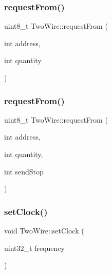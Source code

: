 \mbox{\label{class_two_wire_ad40a27213d0bb32f7b819aa8962fccd3}} 
\subsubsection{\texorpdfstring{request\+From()}{requestFrom()}\hspace{0.1cm}{\footnotesize\ttfamily [4/5]}}
{\footnotesize\ttfamily uint8\+\_\+t Two\+Wire\+::request\+From (\begin{DoxyParamCaption}\item[{int}]{address,  }\item[{int}]{quantity }\end{DoxyParamCaption})}

\mbox{\label{class_two_wire_a3d76da36fb8571e0b5e8310e9f86f6fe}} 
\subsubsection{\texorpdfstring{request\+From()}{requestFrom()}\hspace{0.1cm}{\footnotesize\ttfamily [5/5]}}
{\footnotesize\ttfamily uint8\+\_\+t Two\+Wire\+::request\+From (\begin{DoxyParamCaption}\item[{int}]{address,  }\item[{int}]{quantity,  }\item[{int}]{send\+Stop }\end{DoxyParamCaption})}

\mbox{\label{class_two_wire_a3c4aaae8779a8c34d8a1a90ff317d982}} 
\subsubsection{\texorpdfstring{set\+Clock()}{setClock()}}
{\footnotesize\ttfamily void Two\+Wire\+::set\+Clock (\begin{DoxyParamCaption}\item[{uint32\+\_\+t}]{frequency }\end{DoxyParamCaption})}

